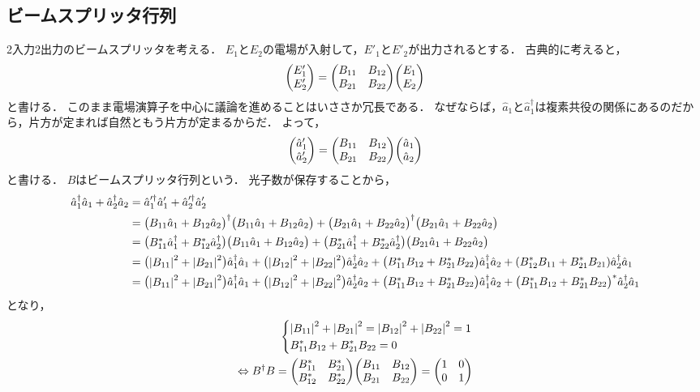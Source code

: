 \documentclass{report}
\begin{document}
  \subsection{ビームスプリッタ行列}
    2入力2出力のビームスプリッタを考える．
    $E_1$と$E_2$の電場が入射して，$E'_1$と$E'_2$が出力されるとする．
    古典的に考えると，
    \begin{align}
      \mqty(E'_1 \\ E'_2) = \mqty(\xmat*{B}{2}{2})\mqty(E_1 \\ E_2)
    \end{align}
    と書ける．
    このまま電場演算子を中心に議論を進めることはいささか冗長である．
    なぜならば，$\hat{a}_1$と$\hat{a}_1^{\dag}$は複素共役の関係にあるのだから，片方が定まれば自然ともう片方が定まるからだ．
    よって，
    \begin{align}
      \mqty(\hat{a}_1' \\ \hat{a}_2') = \mqty(\xmat*{B}{2}{2})\mqty(\hat{a}_1 \\ \hat{a}_2)
    \end{align}
    と書ける．
    $B$はビームスプリッタ行列という．
    光子数が保存することから，
    \begin{align}
      \hat{a}_1^{\dag}\hat{a}_1 + \hat{a}_2^{\dag}\hat{a}_2 &= \hat{a}_1'^{\dag}\hat{a}_1' + \hat{a}_2'^{\dag}\hat{a}_2' \\
      &= \mqty(B_{11}\hat{a}_1 + B_{12}\hat{a}_2)^{\dag}\mqty(B_{11}\hat{a}_1 + B_{12}\hat{a}_2) + \mqty(B_{21}\hat{a}_1 + B_{22}\hat{a}_2)^{\dag}\mqty(B_{21}\hat{a}_1 + B_{22}\hat{a}_2) \\ 
      &= \mqty(B_{11}^*\hat{a}_1^{\dag} + B_{12}^*\hat{a}_2^{\dag})\mqty(B_{11}\hat{a}_1 + B_{12}\hat{a}_2) + \mqty(B_{21}^*\hat{a}_1^{\dag} + B_{22}^*\hat{a}_2^{\dag})\mqty(B_{21}\hat{a}_1 + B_{22}\hat{a}_2) \\ 
      &= \mqty(\abs{B_{11}}^2 + \abs{B_{21}}^2)\hat{a}_1^{\dag}\hat{a}_1 + \mqty(\abs{B_{12}}^2 + \abs{B_{22}}^2)\hat{a}_2^{\dag}\hat{a}_2 + \mqty(B_{11}^*B_{12} + B_{21}^*B_{22})\hat{a}_1^{\dag}\hat{a}_2 + \qty(B_{12}^*B_{11} + B_{21}^*B_{21})\hat{a}_2^{\dag}\hat{a}_1 \\ 
      &= \mqty(\abs{B_{11}}^2 + \abs{B_{21}}^2)\hat{a}_1^{\dag}\hat{a}_1 + \mqty(\abs{B_{12}}^2 + \abs{B_{22}}^2)\hat{a}_2^{\dag}\hat{a}_2 + \mqty(B_{11}^*B_{12} + B_{21}^*B_{22})\hat{a}_1^{\dag}\hat{a}_2 + \mqty(B_{11}^*B_{12} + B_{21}^*B_{22})^*\hat{a}_2^{\dag}\hat{a}_1
    \end{align}
    となり，
    \begin{align}
      \begin{dcases}
        \abs{B_{11}}^2 + \abs{B_{21}}^2 = \abs{B_{12}}^2 + \abs{B_{22}}^2 = 1 \\ 
        B_{11}^*B_{12} + B_{21}^*B_{22} = 0\\ 
      \end{dcases} \\ 
      \Leftrightarrow 
      B^{\dag}B = \mqty(B_{11}^* & B_{21}^* \\ B_{12}^* & B_{22}^*)\mqty(B_{11} & B_{12} \\ B_{21} & B_{22}) = \mqty(1 & 0 \\ 0 & 1)
    \end{align}
\end{document}
